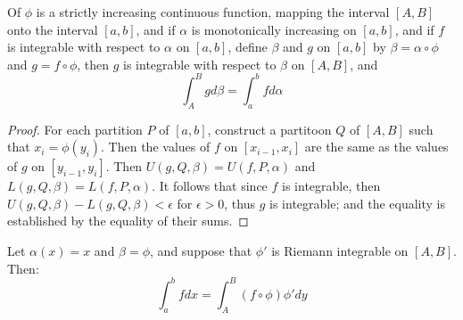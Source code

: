 \begin{theorem}\label{7.2.6}
    Of $\phi$ is a strictly increasing continuous function, mapping the interval
    $[A,B]$ onto the interval  $[a,b]$, and if  $\alpha$ is monotonically
    increasing on  $[a,b]$, and if  $f$ is integrable with respect to  $\alpha$
    on  $[a,b]$, define  $\beta$ and  $g$ on  $[a,b]$ by $\beta=\alpha \circ
    \phi$ and  $g=f \circ \phi$, then $g$ is integrable with respect to  $\beta$
    on  $[A,B]$, and
        \begin{equation}
            \int_{A}^{B}{g} d\beta=\int_{a}^{b}{f} d\alpha
        \end{equation}
\end{theorem}
\begin{proof}
    For each partition $P$ of  $[a,b]$, construct a partitoon  $Q$ of  $[A,B]$
    such that  $x_i=\phi(y_i)$. Then the values of  $f$ on  $[x_{i-1},x_i]$ are
    the same as the values of $g$ on  $[y_{i-1},y_i]$. Then
    $U(g,Q,\beta)=U(f,P,\alpha)$ and $L(g,Q,\beta)=L(f,P,\alpha)$. It follows
    that since $f$ is integrable, then  $U(g,Q,\beta)-L(g,Q,\beta)<\epsilon$ for  $\epsilon>0$,
    thus $g$ is integrable; and the equality is established by the equality of
    their sums.
\end{proof}
\begin{corollary}
    Let $\alpha(x)=x$ and  $\beta=\phi$, and suppose that  $\phi'$ is Riemann
    integrable on  $[A,B]$. Then:
        \begin{equation}
            \int_{a}^{b}{f} dx=\int_{A}^{B}{(f\circ \phi)\phi' dy}
        \end{equation}
\end{corollary}
